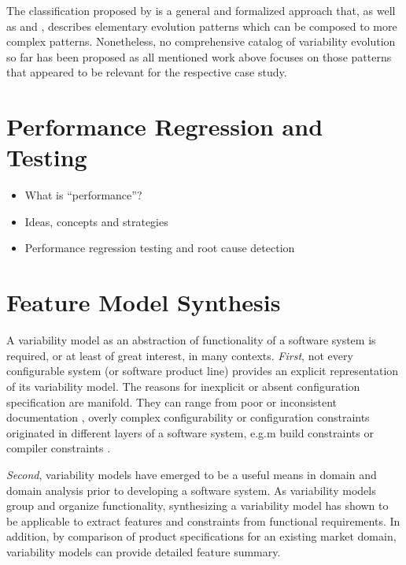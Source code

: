 The classification proposed by \cite{peng_analyzing_2011} is a general and formalized approach
that, as well as \cite{seidl_co-evolution_2012} and \cite{passos_towards_2012}, describes
elementary evolution patterns which can be composed to more complex patterns. Nonetheless, no
comprehensive catalog of variability evolution so far has been proposed as all
mentioned work above focuses on those patterns that appeared to be relevant for
the respective case study.


\section{Performance Regression and Testing} \label{sec:2.2}
\begin{itemize}
  \item What is ``performance''? \citep{molyneaux_art_2014} 
  \item Ideas, concepts and strategies
  \citep{molyneaux_art_2014,fleming_how_1986,woodside_future_2007}
  \item Performance regression testing
  \citep{nguyen_industrial_2014,foo_mining_2010} and root cause detection
  \citep{heger_automated_2013}
\end{itemize}

\section{Feature Model Synthesis}  \label{sec:2.3}
A variability model as an abstraction of functionality of a software system is
required, or at least of great interest, in many contexts. \emph{First}, not
every configurable system (or software product line) provides an explicit
representation of its variability model. 
The reasons for inexplicit or absent configuration specification are manifold.
They can range from poor or inconsistent documentation
\citep{rabkin_static_2011}, overly complex configurability \citep{xu_hey_2015}
or configuration constraints originated in different layers of a software
system, e.g.m build constraints  or compiler constraints \citep{nadi_where_2015}. 

\emph{Second}, variability models have emerged to be a useful means in domain
and domain analysis prior to developing a software system. As variability
models group and organize functionality, synthesizing a variability model has
shown to be applicable to extract features and constraints from functional
requirements. In addition, by comparison of product specifications for an
existing market domain, variability models can provide detailed feature summary.

